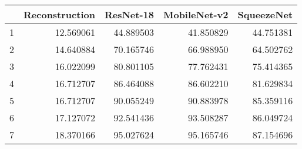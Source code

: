 \begin{tabular}{lrrrr}
\toprule
{} &  Reconstruction &  ResNet-18 &  MobileNet-v2 &  SqueezeNet \\
\midrule
1 &       12.569061 &  44.889503 &     41.850829 &   44.751381 \\
2 &       14.640884 &  70.165746 &     66.988950 &   64.502762 \\
3 &       16.022099 &  80.801105 &     77.762431 &   75.414365 \\
4 &       16.712707 &  86.464088 &     86.602210 &   81.629834 \\
5 &       16.712707 &  90.055249 &     90.883978 &   85.359116 \\
6 &       17.127072 &  92.541436 &     93.508287 &   86.049724 \\
7 &       18.370166 &  95.027624 &     95.165746 &   87.154696 \\
\bottomrule
\end{tabular}
